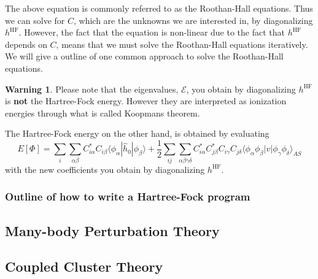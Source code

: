 \documentclass[a4paper,10pt]{article}
\newcommand{\braket}[1]{\langle#1\rangle}
\theoremstyle{definition}
\newtheorem{warning}{Warning}
\begin{document}
The above equation is commonly referred to as the Roothan-Hall equations. Thus we can solve for $C$, which 
are the unknowns we are interested in, by diagonalizing $h^\text{HF}$. However, the fact that the equation is non-linear
due to the fact that $h^{\text{HF}}$ depends on $C$, means that we must solve the Roothan-Hall equations iteratively.
We will give a outline of one common approach to solve the Roothan-Hall equations.

\begin{warning}
 Please note that the eigenvalues, $\mathcal{E}$, you obtain by diagonalizing $h^\text{HF}$ is \textbf{not} 
 the Hartree-Fock energy. However they are interpreted as ionization energies through what is called Koopmans theorem.
 
 The Hartree-Fock energy on the other hand, is obtained by evaluating 
 \begin{equation}
  E[\Phi] = \sum_i \sum_{\alpha \beta} C^*_{i \alpha}C_{i \beta} \braket{\phi_\alpha|\hat{h}_0|\phi_\beta} + \frac{1}{2} \sum_{ij} \sum_{\alpha \beta \gamma \delta} C^*_{i \alpha} C^*_{j \beta} C_{i \gamma} C_{j \delta} \braket{\phi_\alpha \phi_\beta|v|\phi_\gamma \phi_\delta}_{AS}
 \end{equation}
  with the new coefficients you obtain by diagonalizing $h^\text{HF}$.
\end{warning}



\subsubsection{Outline of how to write a Hartree-Fock program}




\subsection{Many-body Perturbation Theory}

\subsection{Coupled Cluster Theory}
\end{document}
